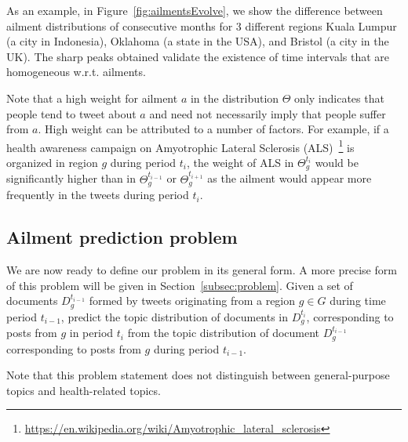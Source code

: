 As an example, in Figure~\ref{fig:ailmentsEvolve}, we show the difference
between ailment distributions of consecutive months for 3 different
regions Kuala Lumpur (a city in Indonesia), Oklahoma (a state in
the USA), and Bristol (a city in the UK). The sharp peaks obtained
validate the existence of time intervals that are homogeneous w.r.t. ailments.

Note that a high weight for ailment $a$ in the distribution $\Theta$
only indicates that people tend to tweet about $a$ 
and need not necessarily imply
that people suffer from $a$. High weight can be attributed to a number 
of factors. For example, if a health awareness campaign on Amyotrophic 
Lateral Sclerosis 
(ALS)~\footnote{\url{https://en.wikipedia.org/wiki/Amyotrophic_lateral_sclerosis}} 
is organized in region $g$ during period $t_i$, the 
weight of ALS in $\Theta_g^{t_i}$ would be significantly higher than 
in $\Theta_g^{t_{i-1}}$ or $\Theta_g^{t_{i+1}}$ as the ailment would
appear more frequently in the tweets during period $t_i$. 

\subsection{Ailment prediction problem}
\label{subsec:problem-general}
We are now ready to define our problem in its general form. A more
precise form of this problem will be given in Section~\ref{subsec:problem}. 
Given a set of documents $D_g^{t_{i-1}}$ formed by tweets originating 
from a region $g \in G$ during time period $t_{i-1}$, predict the 
topic distribution of documents in $D_g^{t_i}$, corresponding to 
posts from $g$ in period $t_i$ from the topic distribution of 
document $D_g^{t_{i-1}}$ corresponding to posts from $g$ during 
period $t_{i-1}$.

Note that this problem statement does not distinguish between
general-purpose topics and health-related topics.

